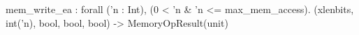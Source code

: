 mem_write_ea : forall ('n : Int), (0 < 'n & 'n <= max_mem_access).
  (xlenbits, int('n), bool, bool, bool) -> MemoryOpResult(unit)